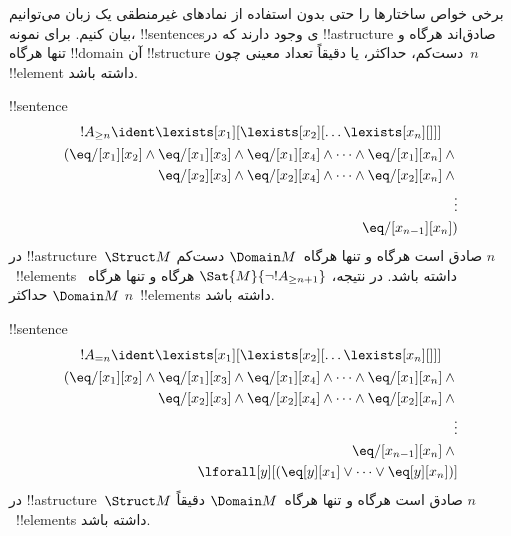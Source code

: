 \documentclass[../../../include/open-logic-section]{subfiles}
\begin{document}


\begin{explain}
برخی خواص ساختارها را حتی بدون استفاده از نمادهای غیرمنطقی یک زبان
می‌توانیم بیان کنیم. برای نمونه، !!{sentence}sی وجود دارند که در
!!a{structure} صادق‌اند هرگاه و تنها هرگاه !!{domain} آن !!{structure}
دست‌کم، حداکثر، یا دقیقاً تعداد معینی چون~$n$ !!{element} داشته باشد.
\end{explain}

\begin{prop}
!!{sentence}
\begin{multline*}
  !A_{\ge n} \ident \lexists[x_1][\lexists[x_2][\dots\lexists[x_n][{}]]]\\
  \begin{aligned}
  (\eq/[x_1][x_2] \land {}
  \eq/[x_1][x_3] \land \eq/[x_1][x_4] \land \dots \land \eq/[x_1][x_n] \land {}\\
\eq/[x_2][x_3] \land \eq/[x_2][x_4] \land \dots \land {} \eq/[x_2][x_n] \land {} \\
\vdots\\
\eq/[x_{n-1}][x_n])
\end{aligned}
\end{multline*}
در !!a{structure}~$\Struct M$ صادق است هرگاه و تنها هرگاه~$\Domain M$
دست‌کم $n$~!!{element}s داشته باشد. در نتیجه،
$\Sat{M}{\lnot !A_{\ge n+1}}$ هرگاه و تنها هرگاه~$\Domain M$ حداکثر
$n$~!!{element}s داشته باشد.

\end{prop}

\begin{prop}
!!{sentence}
\begin{multline*}
!A_{= n} \ident \lexists[x_1][\lexists[x_2][\dots\lexists[x_n][{}]]] \\
\begin{aligned}
  (\eq/[x_1][x_2] \land {}
  \eq/[x_1][x_3] \land \eq/[x_1][x_4] \land \dots \land \eq/[x_1][x_n] \land {}\\
\eq/[x_2][x_3] \land \eq/[x_2][x_4] \land \dots \land {} \eq/[x_2][x_n] \land {} \\
\vdots\\
\eq/[x_{n-1}][x_n] \land {} \\
\lforall[y][(\eq[y][x_1] \lor \dots \lor \eq[y][x_n])]
\end{aligned}
\end{multline*}
در !!a{structure}~$\Struct M$ صادق است هرگاه و تنها هرگاه~$\Domain M$
دقیقاً $n$~!!{element}s داشته باشد.
\end{prop}
\end{document}
